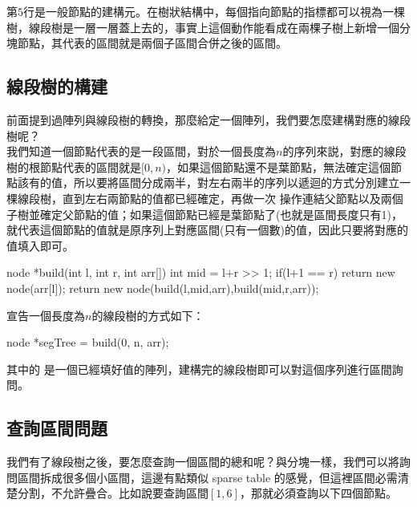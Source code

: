 第$5$行是一般節點的建構元。在樹狀結構中，每個指向節點的指標都可以視為一棵樹，線段樹是一層一層蓋上去的，事實上這個動作能看成在兩棵子樹上新增一個分塊節點，其代表的區間就是兩個子區間合併之後的區間。

\subsection{線段樹的構建}

前面提到過陣列與線段樹的轉換，那麼給定一個陣列，我們要怎麼建構對應的線段樹呢？\\

我們知道一個節點代表的是一段區間，對於一個長度為$n$的序列來説，對應的線段樹的根節點代表的區間就是$[0,n)$，如果這個節點還不是葉節點，無法確定這個節點該有的值，所以要將區間分成兩半，對左右兩半的序列以遞迴的方式分別建立一棵線段樹，直到左右兩節點的值都已經確定，再做一次  操作連結父節點以及兩個子樹並確定父節點的值；如果這個節點已經是葉節點了(也就是區間長度只有1)，就代表這個節點的值就是原序列上對應區間(只有一個數)的值，因此只要將對應的值填入即可。\\

\begin{C++}
node *build(int l, int r, int arr[]){
    int mid = l+r >> 1;
    if(l+1 == r) return new node(arr[l]);
    return new node(build(l,mid,arr),build(mid,r,arr));
}
\end{C++}


宣告一個長度為$n$的線段樹的方式如下：\\

\begin{C++}
node *segTree = build(0, n, arr);
\end{C++}

其中的  是一個已經填好值的陣列，建構完的線段樹即可以對這個序列進行區間詢問。

\subsection{查詢區間問題}

我們有了線段樹之後，要怎麼查詢一個區間的總和呢？與分塊一樣，我們可以將詢問區間拆成很多個小區間，這邊有點類似 sparse table 的感覺，但這裡區間必需清楚分割，不允許疊合。比如說要查詢區間$[1,6]$，那就必須查詢以下四個節點。\\

